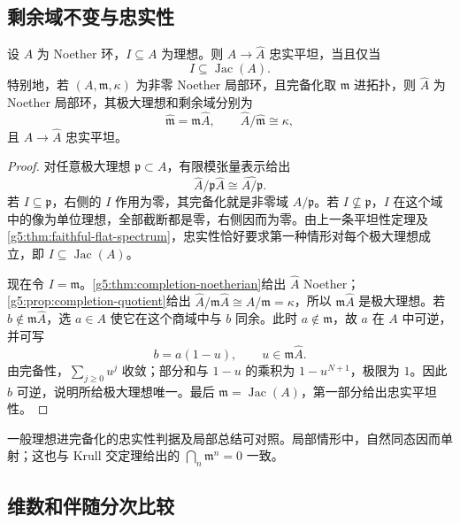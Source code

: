 \subsection{剩余域不变与忠实性}
\label{g5:subsec:0704:02}

\begin{theorem}\label{g5:thm:completion-faithful}
	设 \(A\) 为 Noether 环，\(I\subseteq A\) 为理想。则 \(A\to\widehat A\) 忠实平坦，当且仅当
	\[
		I\subseteq\operatorname{Jac}(A).
	\]
	特别地，若 \((A,\mathfrak m,\kappa)\) 为非零 Noether 局部环，且完备化取 \(\mathfrak m\) 进拓扑，则 \(\widehat A\) 为 Noether 局部环，其极大理想和剩余域分别为
	\[
		\widehat{\mathfrak m}=\mathfrak m\widehat A,
		\qquad \widehat A/\widehat{\mathfrak m}\cong\kappa,
	\]
	且 \(A\to\widehat A\) 忠实平坦。
\end{theorem}
\begin{proof}
	对任意极大理想 \(\mathfrak p\subset A\)，有限模张量表示给出
	\[
		\widehat A/\mathfrak p\widehat A
		\cong\widehat{A/\mathfrak p}.
	\]
	若 \(I\subseteq\mathfrak p\)，右侧的 \(I\) 作用为零，其完备化就是非零域 \(A/\mathfrak p\)。若 \(I\nsubseteq\mathfrak p\)，\(I\) 在这个域中的像为单位理想，全部截断都是零，右侧因而为零。由上一条平坦性定理及\cref{g5:thm:faithful-flat-spectrum}，忠实性恰好要求第一种情形对每个极大理想成立，即 \(I\subseteq\operatorname{Jac}(A)\)。

	现在令 \(I=\mathfrak m\)。\cref{g5:thm:completion-noetherian}给出 \(\widehat A\) Noether；\cref{g5:prop:completion-quotient}给出
	\(\widehat A/\mathfrak m\widehat A\cong A/\mathfrak m=\kappa\)，所以 \(\mathfrak m\widehat A\) 是极大理想。若 \(b\notin\mathfrak m\widehat A\)，选 \(a\in A\) 使它在这个商域中与 \(b\) 同余。此时 \(a\notin\mathfrak m\)，故 \(a\) 在 \(A\) 中可逆，并可写
	\[
		b=a(1-u),\qquad u\in\mathfrak m\widehat A.
	\]
	由完备性，\(\sum_{j\geq0}u^j\) 收敛；部分和与 \(1-u\) 的乘积为 \(1-u^{N+1}\)，极限为 \(1\)。因此 \(b\) 可逆，说明所给极大理想唯一。最后 \(\mathfrak m=\operatorname{Jac}(A)\)，第一部分给出忠实平坦性。
\end{proof}

一般理想进完备化的忠实性判据及局部总结可对照\cite[第8节，定理8.14及节末总结，第62—63页]{Matsumura1989}。局部情形中，自然同态因而单射；这也与 Krull 交定理给出的 \(\bigcap_n\mathfrak m^n=0\) 一致。

\subsection{维数和伴随分次比较}
\label{g5:subsec:0704:03}

